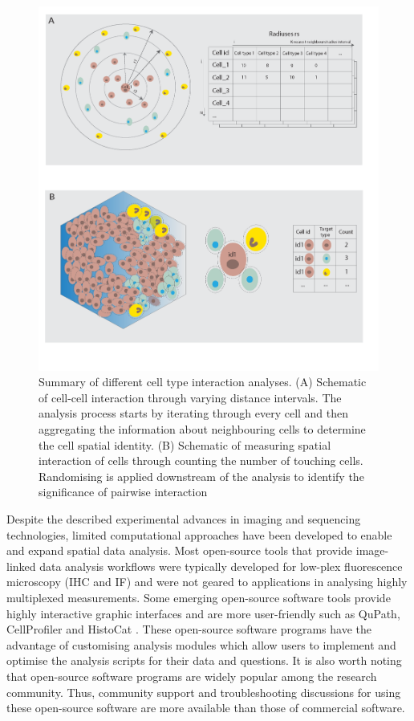 \begin{figure}
    \centering
    \includegraphics[width=0.85\columnwidth]{Chapter3/Figures/Conceptualise_CCC_analysis_cropped-01.png}
    \caption[Summary of different cell type interaction analyses.]{Summary of different cell type interaction analyses. (A) Schematic of cell-cell interaction through varying distance intervals. The analysis process starts by iterating through every cell and then aggregating the information about neighbouring cells to determine the cell spatial identity. (B) Schematic of measuring spatial interaction of cells through counting the number of touching cells. Randomising is applied downstream of the analysis to identify the significance of pairwise interaction}
    \label{fig:CCC_conceptualised}
\end{figure}

Despite the described experimental advances in imaging and sequencing technologies, limited computational approaches have been developed to enable and expand spatial data analysis. Most open-source tools that provide image-linked data analysis workflows were typically developed for low-plex fluorescence microscopy (\ie IHC and IF) and were not geared to applications in analysing highly multiplexed measurements. Some emerging open-source software tools provide highly interactive graphic interfaces and are more user-friendly such as QuPath, CellProfiler and HistoCat \cite{bankhead2017qupath, carpenter2006cellprofiler, schapiro2017histocat}. These open-source software programs have the advantage of customising analysis modules which allow users to implement and optimise the analysis scripts for their data and questions. It is also worth noting that open-source software programs are widely popular among the research community. Thus, community support and troubleshooting discussions for using these open-source software are more available than those of commercial software. 


